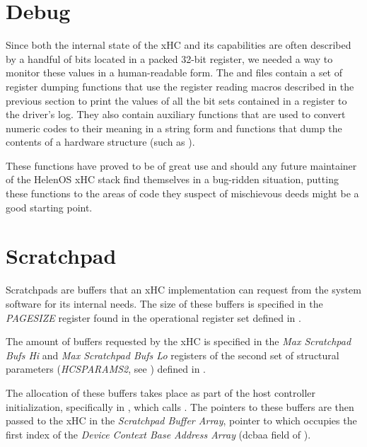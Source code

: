 \section{Debug}

Since both the internal state of the xHC and its capabilities are often described by
a handful of bits located in a packed 32-bit register, we needed a way to monitor these
values in a human-readable form. The  and
 files contain a set of register dumping
functions that use the register reading macros described in the previous section to print
the values of all the bit sets contained in a register to the driver's log. They also contain
auxiliary functions that are used to convert numeric codes to their meaning in a string form and
functions that dump the contents of a hardware structure (such as ).

These functions have proved to be of great use and should any future maintainer of the
HelenOS xHC stack find themselves in a bug-ridden situation, putting these functions to
the areas of code they suspect of mischievous deeds might be a good starting point.



\section{Scratchpad}
\label{sec:scratchpads}

Scratchpads are buffers that an xHC implementation can request from the system software
for its internal needs. The size of these buffers is specified in the \textit{PAGESIZE} register
found in the operational register set defined in .

The amount of buffers requested by the xHC is specified in the \textit{Max Scratchpad Bufs Hi} and
\textit{Max Scratchpad Bufs Lo} registers of the second set of structural parameters (\textit{HCSPARAMS2},
see ) defined in .

The allocation of these buffers takes place as part of the host controller initialization,
specifically in , which calls . The pointers
to these buffers are then passed to the xHC in the \textit{Scratchpad Buffer Array}, pointer to which
occupies the first index of the \textit{Device Context Base Address Array} (dcbaa field of
).

